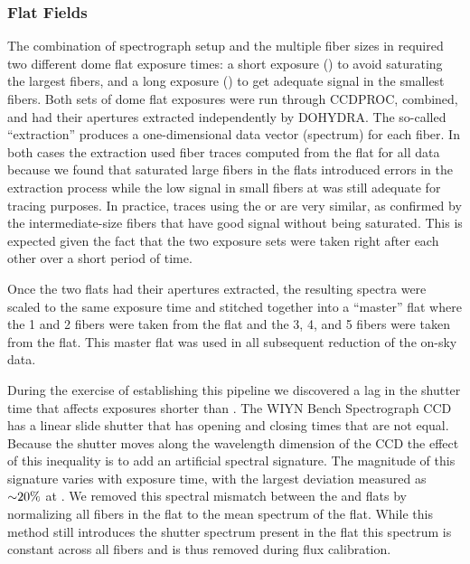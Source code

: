\subsubsection{Flat Fields}
\label{891_1:sec:flats}

The combination of spectrograph setup and the multiple fiber sizes in
\GP required two different dome flat exposure times: a short exposure
() to avoid saturating the largest fibers, and a long
exposure () to get adequate signal in the smallest fibers.
Both sets of dome flat exposures were run through CCDPROC, combined,
and had their apertures extracted independently by DOHYDRA.  The
so-called ``extraction'' produces a one-dimensional data vector
(spectrum) for each fiber. In both cases the extraction used fiber
traces computed from the  flat for all data because we found
that saturated large fibers in the  flats introduced errors
in the extraction process while the low signal in small fibers at
 was still adequate for tracing purposes. In practice,
traces using the  or  are very similar, as
confirmed by the intermediate-size fibers that have good signal
without being saturated. This is expected given the fact that the two
exposure sets were taken right after each other over a short period of
time.

Once the two flats had their apertures extracted, the resulting
spectra were scaled to the same exposure time and stitched together
into a ``master'' flat where the 1 and 2 fibers were
taken from the  flat and the 3, 4, and
5 fibers were taken from the  flat. This master flat
was used in all subsequent reduction of the on-sky data.

During the exercise of establishing this pipeline we discovered a lag
in the shutter time that affects exposures shorter than . The WIYN Bench Spectrograph CCD has a linear slide shutter
that has opening and closing times that are not equal. Because the
shutter moves along the wavelength dimension of the CCD the effect of
this inequality is to add an artificial spectral signature. The
magnitude of this signature varies with exposure time, with the
largest deviation measured as ${\sim} 20\%$ at . We removed
this spectral mismatch between the  and  flats by
normalizing all fibers in the  flat to the mean spectrum of
the  flat. While this method still introduces the shutter
spectrum present in the  flat this spectrum is constant
across all fibers and is thus removed during flux calibration.

